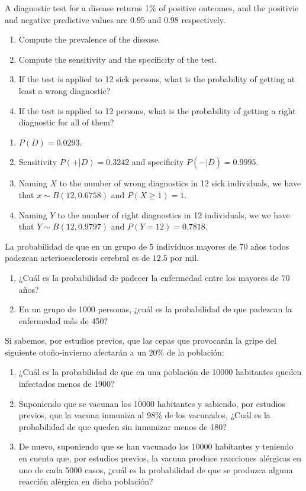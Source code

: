 {A diagnostic test for a disease returns 1\% of positive outcomes, and the positivie and negative predictive values are $0.95$ and $0.98$ respectively. 
\begin{enumerate}
\item Compute the prevalence of the disease.
\item Compute the sensitivity and the specificity of the test.
\item If the test is applied to 12 sick persons, what is the probability of getting at least a wrong diagnostic?
\item If the test is applied to 12 persons, what is the probability of getting a right diagnostic for all of them?
\end{enumerate}
} 
{
\begin{enumerate}
\item $P(D)=0.0293$.
\item Sensitivity $P(+|D)=0.3242$ and specificity $P(-|\overline D)=0.9995$. 
\item Naming $X$ to the number of wrong diagnostics in 12 sick individuals, we have that $x\sim B(12,0.6758)$ and $P(X\geq 1)=1$. 
\item Naming $Y$ to the number of right diagnostics in 12 individuals, we we have that $Y\sim B(12,0.9797)$ and $P(Y=12)=0.7818$. 
\end{enumerate}
}
{
}


{La probabilidad de que en un grupo de 5 individuos mayores de 70 años todos padezcan arterioesclerosis cerebral es de $12.5$ por mil.
\begin{enumerate}
\item ¿Cuál es la probabilidad de padecer la enfermedad entre los mayores de 70 años?
\item En un grupo de 1000 personas, ¿cuál es la probabilidad de que padezcan la enfermedad más de 450?
\end{enumerate}
} 
{
}
{
}


{Si sabemos, por estudios previos, que las cepas que provocarán la gripe del siguiente otoño-invierno afectarán a un 20\% de la
población:
\begin{enumerate}
\item ¿Cuál es la probabilidad de que en una población de 10000 habitantes queden infectados menos de 1900?
\item Suponiendo que se vacunan los 10000 habitantes y sabiendo, por estudios previos, que la vacuna inmuniza al 98\% de los vacunados,
¿Cuál es la probabilidad de que queden sin inmunizar menos de 180?
\item De nuevo, suponiendo que se han vacunado los 10000 habitantes y teniendo en cuenta que, por estudios previos, la vacuna produce
reacciones alérgicas en uno de cada 5000 casos, ¿cuál es la probabilidad de que se produzca alguna reacción alérgica en dicha población?
\end{enumerate}
} 
{
}
{
}

